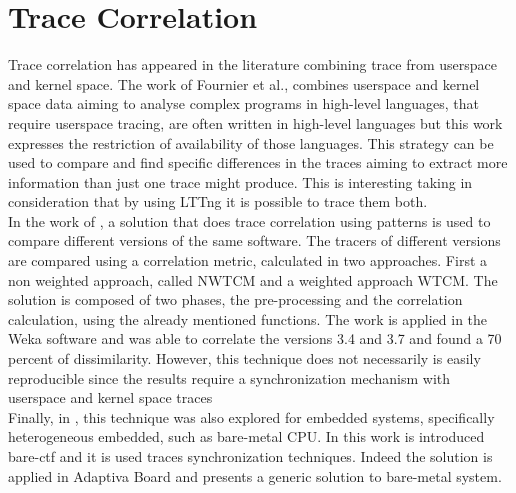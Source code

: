  
\section{Trace Correlation}
Trace correlation has appeared in the literature combining trace from userspace and kernel space. The work of Fournier et al., combines userspace and kernel space data aiming to analyse complex programs in high-level languages, that require userspace tracing, are often written in high-level languages but this work expresses the restriction of availability of those languages. This strategy can be used to compare and find specific differences in the traces aiming to extract more information than just one trace might produce. This is interesting taking in consideration that by using LTTng it is possible to trace them both.\\
In the work of \cite{pattern_based}, a solution that does trace correlation using patterns is used to compare different versions of the same software. The tracers of different versions are compared using a correlation metric, calculated in two approaches. First a non weighted approach, called NW\textunderscore TCM and a weighted approach  W\textunderscore TCM. The solution is composed of two phases, the pre-processing and the correlation calculation, using the already mentioned functions. The work is applied in the Weka \cite{weka} software and was able to correlate the versions 3.4 and 3.7 and found a 70 percent of dissimilarity. However, this technique does not necessarily is easily reproducible since the results require a synchronization mechanism with userspace and kernel space traces\\
Finally, in \cite{thomas}, this technique was also explored for embedded systems, specifically heterogeneous embedded, such as bare-metal CPU. In this work is introduced bare-ctf and it is used traces synchronization techniques. Indeed the solution is applied in Adaptiva Board and presents a generic solution to bare-metal system.
